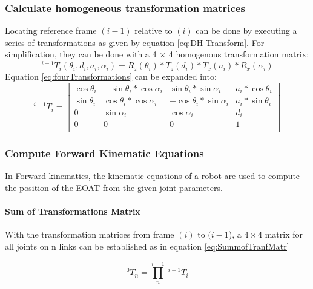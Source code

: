 \subsubsection{Calculate homogeneous transformation matrices}

Locating reference frame $(i-1)$ relative to $(i)$ can be done by executing a series of transformations as given by equation \ref{eq:DH-Transform}. 
For simplification, they can be done with a 4 × 4 homogenous transformation matrix:
\begin{equation} \label{eq:fourTransformations}
^{i-1}T_i(\theta_i,d_i,a_i,\alpha_i)=R_z(\theta_i)*T_z(d_i)*T_x(a_i)*R_x(\alpha_i)
\end{equation}
Equation \ref{eq:fourTransformations} can be expanded into:
\begin{equation}\label{eq:TransformationMarix}
^{i-1}T_i=
\begin{bmatrix}
\cos\theta_i & -\sin\theta_i*\cos\alpha_i & \sin\theta_i*\sin\alpha_i & a_i*\cos\theta_i \\
\sin\theta_i & \cos\theta_i*\cos\alpha_i & -\cos\theta_i*\sin\alpha_i & a_i*\sin\theta_i \\ %
0 & \sin\alpha_i & \cos\alpha_i & d_i \\
0 & 0 & 0 & 1 \\
\end{bmatrix}
\end{equation}



\subsubsection{Compute Forward Kinematic Equations} \label{ForKinEq}
In Forward kinematics, the kinematic equations of a robot are used to compute the position of the \ac{EOAT} from the given joint parameters.

\paragraph{Sum of Transformations Matrix}
With the transformation matrices from frame $(i)$ to $(i-1$), a $4×4$ matrix for all joints on n links can be established as in equation \ref{eq:SummofTranfMatr}

\begin{equation} \label{eq:SummofTranfMatr}
^0T_n=\prod_{n}^{i=1} \phantom{.}^{i-1}T_i
\end{equation}


